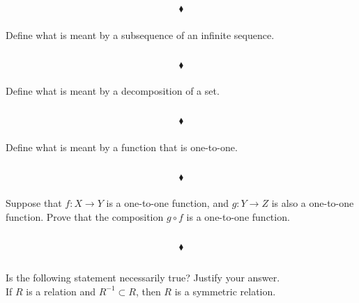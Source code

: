 $$\blacklozenge$$

\subsubsection{}
\begin{tcolorbox}
Define what is meant by a subsequence of an infinite sequence.
\end{tcolorbox}
$$ $$

$$\blacklozenge$$

\subsubsection{}
\begin{tcolorbox}
Define what is meant by a decomposition of a set.
\end{tcolorbox}
$$ $$

$$\blacklozenge$$

\subsubsection{}
\begin{tcolorbox}
Define what is meant by a function that is one-to-one.
\end{tcolorbox}
$$ $$

$$\blacklozenge$$

\subsubsection{}
\begin{tcolorbox}
Suppose that $f:X\rightarrow Y$ is a one-to-one function, and $g: Y \rightarrow Z$ is also a one-to-one function. Prove that the composition $g \circ f$ is a one-to-one function. 

\end{tcolorbox}
$$ $$

$$\blacklozenge$$


\renewcommand{\thesubsection}{\thesection.\RomanNumeralCaps{9}}
\subsection{}
\begin{tcolorbox}
Is the following statement necessarily true? Justify your answer.\\ If $R$ is a relation and $R^{-1} \subset R$, then $R$ is a symmetric relation. 
\end{tcolorbox}
$$ $$

